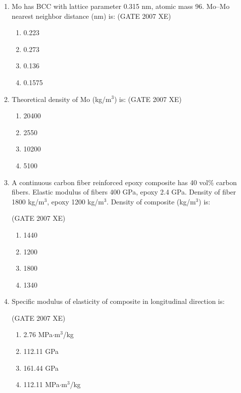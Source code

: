 \documentclass[journal,cmex10]{IEEEtran}
\theoremstyle{remark}
\numberwithin{equation}{enumi}
\numberwithin{figure}{enumi}
\begin{document}
\begin{enumerate}
\newpage
\item  Mo has BCC with lattice parameter 0.315 nm, atomic mass 96. Mo–Mo nearest neighbor distance (nm) is: 
\hfill{(GATE 2007 XE)}
\begin{multicols}{4}
\begin{enumerate}
    \item 0.223
    \item 0.273
    \item 0.136
    \item 0.1575
\end{enumerate}
\end{multicols}

\item  Theoretical density of Mo (kg/m$^3$) is:  
\hfill{(GATE 2007 XE)}
\begin{multicols}{4}
\begin{enumerate}
    \item 20400
    \item 2550
    \item 10200
    \item 5100
\end{enumerate}
\end{multicols}


\item  A continuous carbon fiber reinforced epoxy composite has 40 vol\% carbon fibers. Elastic modulus of fibers 400 GPa, epoxy 2.4 GPa. Density of fiber 1800 kg/m$^3$, epoxy 1200 kg/m$^3$. Density of composite (kg/m$^3$) is:  

\hfill{(GATE 2007 XE)}
\begin{multicols}{4}
\begin{enumerate}
    \item 1440
    \item 1200
    \item 1800
    \item 1340
\end{enumerate}
\end{multicols}

\item Specific modulus of elasticity of composite in longitudinal direction is:  

\hfill{(GATE 2007 XE)}
\begin{multicols}{2}
\begin{enumerate}
    \item 2.76 MPa$\cdot$m$^3$/kg
    \item 112.11 GPa
    \item 161.44 GPa
    \item 112.11 MPa$\cdot$m$^3$/kg
\end{enumerate}
\end{multicols}


\end{enumerate}
\end{document}
